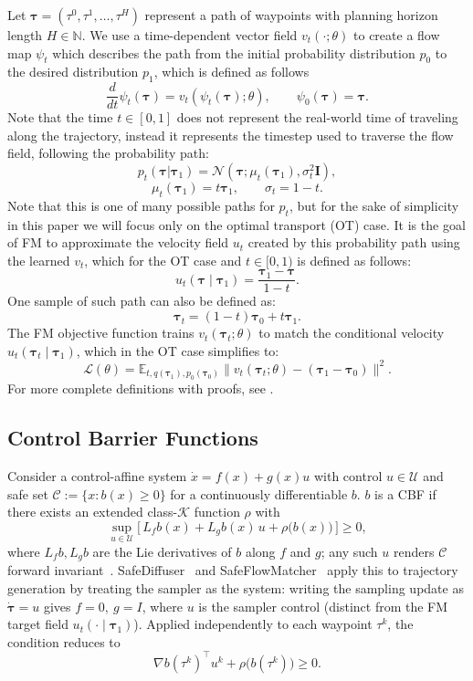 \documentclass[letterpaper]{article} %
\begin{document}
Let \(\boldsymbol{\tau}=(\tau^0, \tau^1, \hdots, \tau^H)\) represent a path of waypoints with planning horizon length \(H \in \mathbb{N}\). We use a time-dependent vector field \(v_t(\cdot;\theta)\) to create a flow map \(\psi_t\) which describes the path from the initial probability distribution \(p_0\) to the desired distribution \(p_1\), which is defined as follows 
\[
\frac{d}{dt}\psi_t(\boldsymbol{\tau})=v_t(\psi_t(\boldsymbol{\tau});\theta),\qquad \psi_0(\boldsymbol{\tau})=\boldsymbol{\tau}.
\]
Note that the time \(t \in [0,1]\) does not represent the real-world time of traveling along the trajectory, instead it represents the timestep used to traverse the flow field, following the probability path:
\[
p_t(\boldsymbol{\tau}|\boldsymbol{\tau}_1)=\mathcal{N}(\boldsymbol{\tau}; \mu_t(\boldsymbol{\tau}_1),\sigma^2_t\mathbf{I}),
\]
\[
\mu_t(\boldsymbol{\tau}_1)=t\boldsymbol{\tau}_1, \qquad \sigma_t=1-t.
\]
Note that this is one of many possible paths for \(p_t\), but for the sake of simplicity in this paper we will focus only on the optimal transport (OT) case. It is the goal of FM to approximate the velocity field \(u_t\) created by this probability path using the learned \(v_t\), which for the OT case and \(t\in[0,1)\) is defined as follows:
\[
u_t(\boldsymbol{\tau} \mid \boldsymbol{\tau}_1)=\frac{\boldsymbol{\tau}_1-\boldsymbol{\tau}}{1-t}.
\]
One sample of such path can also be defined as:
\[
\boldsymbol{\tau}_t=(1-t)\boldsymbol{\tau}_0+t\boldsymbol{\tau}_1.
\]
The FM objective function trains \(v_t(\boldsymbol{\tau}_t;\theta)\) to match the conditional velocity \(u_t(\boldsymbol{\tau}_t\mid\boldsymbol{\tau}_1)\), which in the OT case simplifies to:
\[
\mathcal{L}(\theta)=\mathbb{E}_{t, q(\boldsymbol{\tau}_1), p_0(\boldsymbol{\tau}_0)}\big\|v_t(\boldsymbol{\tau}_t;\theta)-(\boldsymbol{\tau}_1-\boldsymbol{\tau}_0)\big\|^2
.\]
For more complete definitions with proofs, see \cite{lipman_flowmatching_2022}.

\subsection{Control Barrier Functions}
Consider a control-affine system \(\dot{x} = f(x) + g(x)u\) with control
\(u \in \mathcal{U}\) and safe set \(\mathcal{C} := \{x : b(x) \ge 0\}\) for a
continuously differentiable \(b\). \(b\) is a CBF if there exists an extended
class-\(\mathcal{K}\) function \(\rho\) with
\[
\sup_{u \in \mathcal{U}} \big[\, L_f b(x) + L_g b(x)\,u + \rho\big(b(x)\big) \,\big] \ge 0,
\]
where \(L_f b, L_g b\) are the Lie derivatives of \(b\) along \(f\) and \(g\); any
such \(u\) renders \(\mathcal{C}\) forward invariant~\cite{ames_cbf-qp_2017}.
SafeDiffuser~\cite{xiao_safediffuser_2023} and
SafeFlowMatcher~\cite{yang_safeflowmatcher_2025} apply this to trajectory generation
by treating the sampler as the system: writing the sampling update as
\(\dot{\boldsymbol\tau} = u\) gives \(f = 0,\ g = I\), where \(u\) is the sampler
control (distinct from the FM target field \(u_t(\cdot \mid \boldsymbol{\tau}_1)\)).
Applied independently to each waypoint \(\tau^k\), the condition reduces to
\[
\nabla b(\tau^k)^\top u^k + \rho\big(b(\tau^k)\big) \ge 0 .
\]
\end{document}
